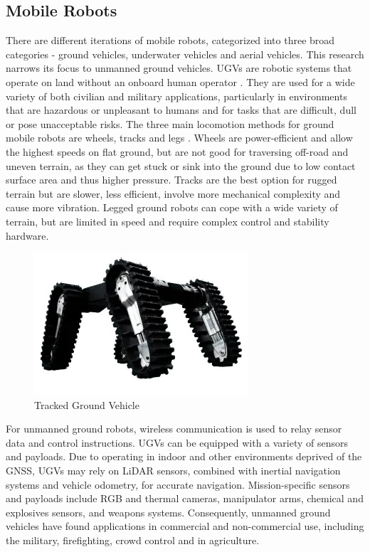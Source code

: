 \subsection{Mobile Robots}
There are different iterations of mobile robots, categorized into three broad categories - ground vehicles, underwater vehicles and aerial vehicles. This research narrows its focus to unmanned ground vehicles. \ac{UGVs} are robotic systems that operate on land without an onboard human operator \cite{rees_unmanned_nodate}. They are used for a wide variety of both civilian and military applications, particularly in environments that are hazardous or unpleasant to humans and for tasks that are difficult, dull or pose unacceptable risks. The three main locomotion methods for ground mobile robots are wheels, tracks and legs \cite{rees_unmanned_nodate}. Wheels are power-efficient and allow the highest speeds on flat ground, but are not good for traversing off-road and uneven terrain, as they can get stuck or sink into the ground due to low contact surface area and thus higher pressure. Tracks are the best option for rugged terrain but are slower, less efficient, involve more mechanical complexity and cause more vibration. Legged ground robots can cope with a wide variety of terrain, but are limited in speed and require complex control and stability hardware.

\begin{figure}[H]
    \centering
    \includegraphics{Figures/ASI-Chaos-Unmanned-Vehicle.jpg}
    \caption{Tracked Ground Vehicle}
    \label{fig:trackedGV}
\end{figure}

For unmanned ground robots, wireless communication is used to relay sensor data and control instructions. \ac{UGVs} can be equipped with a variety of sensors and payloads. Due to operating in indoor and other environments deprived of the  \ac{GNSS}, \ac{UGVs} may rely on \ac{LiDAR} sensors, combined with inertial navigation systems and vehicle odometry, for accurate navigation\cite{rees_unmanned_nodate}. Mission-specific sensors and payloads include RGB and thermal cameras, manipulator arms, chemical and explosives sensors, and weapons systems\cite{rees_unmanned_nodate}. Consequently, unmanned ground vehicles have found applications in commercial and non-commercial use, including the military, firefighting, crowd control and in agriculture.


